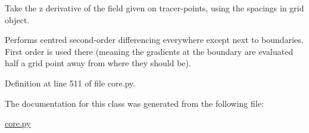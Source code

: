Take the z derivative of the field given on tracer-\/points, using the spacings in grid object. 

Performs centred second-\/order differencing everywhere except next to boundaries. First order is used there (meaning the gradients at the boundary are evaluated half a grid point away from where they should be). 

Definition at line 511 of file core.\+py.



The documentation for this class was generated from the following file\+:\begin{DoxyCompactItemize}
\item 
\hyperlink{core_8py}{core.\+py}\end{DoxyCompactItemize}
